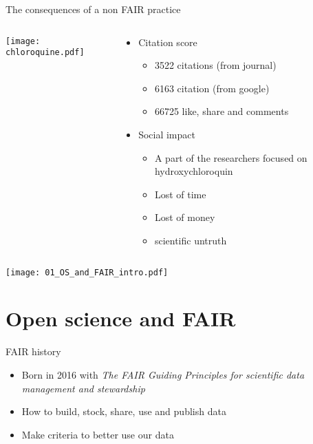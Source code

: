 \begin{frame}{The consequences of a non FAIR practice}
\begin{columns}
\begin{column}{0.5\textwidth}
    \begin{center}
     \texttt{[image: chloroquine.pdf]}
     \end{center}
\end{column}
\begin{column}{0.5\textwidth} 
\begin{itemize}
\item Citation score
     \begin{itemize}
		\item 3522 citations (from journal)
		\item 6163 citation (from google)
		\item 66725 like, share and comments
	\end{itemize}
\item Social impact
	\begin{itemize}
	\item A part of the researchers focused on hydroxychloroquin
	\item Lost of time
	\item Lost of money
	\item scientific untruth
	\end{itemize}		
\end{itemize}

\end{column}
\end{columns}

\end{frame}

\begin{frame}
\texttt{[image: 01\_OS\_and\_FAIR\_intro.pdf]}
\end{frame}


\section{Open science and FAIR}

\begin{frame}
\begin{block}{FAIR history}
\begin{itemize}
\item Born in 2016 with \textit{The FAIR Guiding Principles for scientific data management and stewardship}
\item How to build, stock, share, use and publish data
\item Make criteria to better use our data
\end{itemize}
\end{block}
\end{frame}

